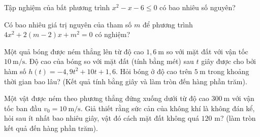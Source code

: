  
\setcounter{ex}{0}
\begin{ex}%
	Tập nghiệm của bất phương trình $x^2-x-6\leqslant 0$ có bao nhiêu số nguyên?\\
	\par{}
\end{ex}
\begin{ex}%
	Có bao nhiêu giá trị nguyên của tham số $m$ để phương trình $4x^2+2(m-2)x+m^2=0$ có nghiệm?
	\par{}
\end{ex}
\begin{ex}%
	Một quả bóng được ném thẳng lên từ độ cao $1{,}6 \mathrm{~m}$ so với mặt đất với vận tốc $10 \mathrm{~m} / \mathrm{s}$. Độ cao của bóng so với mặt đất (tính bằng mét) sau $t$ giây được cho bởi hàm số $h(t) = -4{,}9t^2 + 10t + 1{,}6$. Hỏi bóng ở độ cao trên $5 \mathrm{~m}$ trong khoảng thời gian bao lâu? (Kết quả tính bằng giây và làm tròn đến hàng phần trăm).\\
\end{ex}
\begin{ex}%
	Một vật được ném theo phương thẳng đứng xuống dưới từ độ cao $300 \mathrm{~m}$ với vận tốc ban đầu $v_0=10 \mathrm{~m} / \mathrm{s}$. Giả thiết rằng sức cản của không khí là không đán kể, hỏi sau ít nhất bao nhiêu giây, vật đó cách mặt đất không quá $120$ m? (làm tròn kết quả đến hàng phần trăm).
	\par{}
\end{ex}


